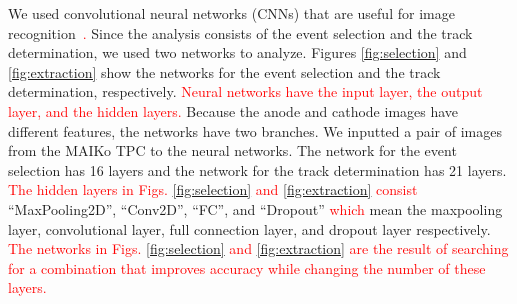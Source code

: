 \documentclass{jps-cp}
\begin{document}
We used convolutional neural networks (CNNs) that are useful for image recognition~\cite{lenet,alexnet}\textcolor{red}{.}
Since the analysis consists of the event selection and the track determination,
we used two networks to analyze.
Figures \ref{fig:selection} and \ref{fig:extraction} show
the networks for the event selection and the track determination, respectively.
\textcolor{red}{Neural networks have the input layer, the output layer, and the hidden layers.}
Because the anode and cathode images have different features,
the networks have two branches.
We inputted a pair of images from the MAIKo TPC to the neural networks.
The network for the event selection has 16 layers and the network for the track determination has 21 layers.
\textcolor{red}{The hidden layers in Figs. \ref{fig:selection} and \ref{fig:extraction} consist} ``MaxPooling2D'', ``Conv2D'', ``FC'', and ``Dropout''
\textcolor{red}{which} mean the maxpooling layer, convolutional layer, full connection layer, and dropout layer respectively.
\textcolor{red}{The networks in Figs. \ref{fig:selection} and \ref{fig:extraction} are
  the result of searching for a combination that improves accuracy while changing the number of these layers.}
\end{document}
